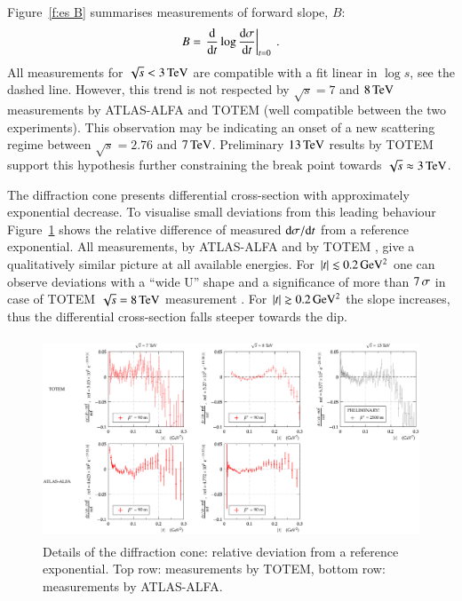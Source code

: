 \documentclass{webofc}
\def\un#1{\,{\rm #1}}
\def\d{{\rm d}}
\begin{document}
Figure~\ref{f:es B} summarises measurements of forward slope, $B$:
\begin{equation}
B = \left. {\d\over \d t} \log {\d\sigma\over \d t} \right|_{t = 0}\ .
\end{equation}
All measurements for $\sqrt s < 3\un{TeV}$ are compatible with a fit linear in $\log s$, see the dashed line. However, this trend is not respected by $\sqrt s = 7$ and $8\un{TeV}$ measurements by ATLAS-ALFA \cite{alfa-si-el-7tev,alfa-si-el-8tev} and TOTEM \cite{totem-si-el-7tev,totem-si-8tev} (well compatible between the two experiments). This observation may be indicating an onset of a new scattering regime between $\sqrt s = 2.76$ and $7\un{TeV}$. Preliminary $13\un{TeV}$ results by TOTEM support this hypothesis further constraining the break point towards $\sqrt s \approx 3\un{TeV}$.

The diffraction cone presents differential cross-section with approximately exponential decrease. To visualise small deviations from this leading behaviour Figure~\ref{f:es non-exp} shows the relative difference of measured $\d\sigma/\d t$ from a reference exponential. All measurements, by ATLAS-ALFA \cite{alfa-si-el-7tev,alfa-si-el-8tev} and by TOTEM \cite{totem-si-el-7tev,totem-el-non-exp-8tev}, give a qualitatively similar picture at all available energies. For $|t| \lesssim 0.2\un{GeV^2}$ one can observe deviations with a ``wide U'' shape and a significance of more than $7\un{\sigma}$ in case of TOTEM $\sqrt s = 8\un{TeV}$ measurement \cite{totem-el-non-exp-8tev}. For $|t| \gtrsim 0.2\un{GeV^2}$ the slope increases, thus the differential cross-section falls steeper towards the dip.

\begin{figure}[h]
\centering
\includegraphics[height=6cm,clip]{fig/es_t_dist_rel_cmp.pdf}
\vskip-4mm
\caption{Details of the diffraction cone: relative deviation from a reference exponential. Top row: measurements by TOTEM, bottom row: measurements by ATLAS-ALFA.}
\label{f:es non-exp}
\end{figure}
\end{document}
